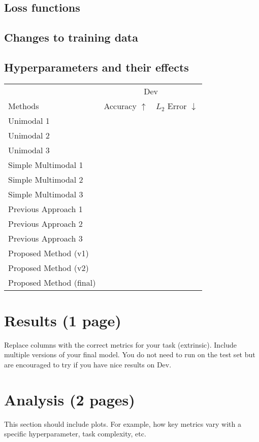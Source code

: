\documentclass[11pt,a4paper]{article}
\begin{document}
\subsection{Loss functions}

\subsection{Changes to training data}

\subsection{Hyperparameters and their effects}

\clearpage
\begin{table}[t]
\centering
\begin{tabular}{@{}lrr@{}}
\toprule
                            & \multicolumn{2}{c}{Dev} \\
Methods                     & Accuracy $\uparrow$ & $L_2$ Error $\downarrow$  \\
\midrule
Unimodal 1 \cite{} & & \\
Unimodal 2 \cite{} & & \\
Unimodal 3 \cite{} & & \\
\midrule
Simple Multimodal 1 \cite{} & & \\
Simple Multimodal 2 \cite{} & & \\
Simple Multimodal 3 \cite{} & & \\
\midrule
Previous Approach 1 \cite{} & & \\
Previous Approach 2 \cite{} & & \\
Previous Approach 3 \cite{} & & \\
\midrule
Proposed Method (v1)            & & \\
Proposed Method (v2)            & & \\
Proposed Method (final)            & & \\
\bottomrule
\end{tabular}
\end{table}
\section{Results (1 page)}
Replace columns with the correct metrics for your task (extrinsic). Include multiple versions of your final model.  You do not need to run on the test set but are encouraged to try if you have nice results on Dev.

\clearpage
\section{Analysis (2 pages)}
This section should include plots.  For example, how key metrics vary with a specific hyperparameter, task complexity, etc.
\end{document}
